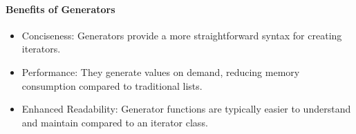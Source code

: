 \documentclass[oneside,11pt,dvipsnames]{book}
\begin{document}
\paragraph{Benefits of Generators}
\begin{itemize}
    \item Conciseness: Generators provide a more straightforward syntax for creating iterators.
	\item Performance: They generate values on demand, reducing memory consumption compared to traditional lists.
	\item Enhanced Readability: Generator functions are typically easier to understand and maintain compared to an iterator class.    
\end{itemize}   

\end{document}
